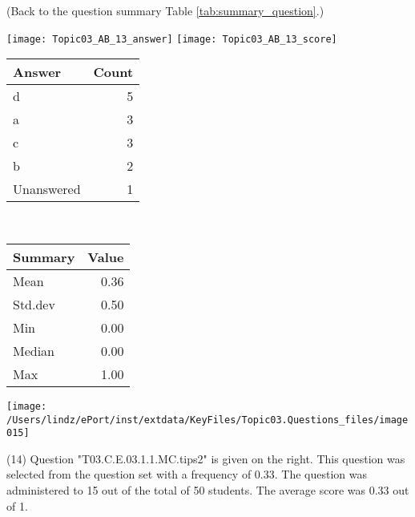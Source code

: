 \documentclass[12pt,english,nohyper]{tufte-handout}\usepackage[]{graphicx}\usepackage[]{color}
\begin{document}
 (Back to the question summary Table \ref{tab:summary_question}.)

\begin{center} \texttt{[image: Topic03\_AB\_13\_answer]} \texttt{[image: Topic03\_AB\_13\_score]} \end{center} 

\begin{center}%
\begin{tabular}{lr}
  \hline
Answer & Count \\ 
  \hline
d &   5 \\ 
  a &   3 \\ 
  c &   3 \\ 
  b &   2 \\ 
  Unanswered &   1 \\ 
   \hline
\end{tabular}
~~~~~~~~%
\begin{tabular}{lr}
  \hline
Summary & Value \\ 
  \hline
Mean & 0.36 \\ 
  Std.dev & 0.50 \\ 
  Min & 0.00 \\ 
  Median & 0.00 \\ 
  Max & 1.00 \\ 
   \hline
\end{tabular}
\end{center}\newpage{}



\vspace{4cm}\begin{marginfigure}\texttt{[image: /Users/lindz/ePort/inst/extdata/KeyFiles/Topic03.Questions\_files/image015]}\end{marginfigure}\vspace{-4cm} (14) Question "T03.C.E.03.1.1.MC.tips2" is given on the right. This question was selected from the question set with a frequency of 0.33. The question was administered to 15 out of the total of 50 students. The average score was 0.33 out of 1.
\end{document}
